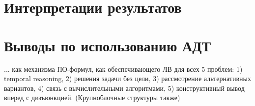 \section{Интерпретации результатов}

\section{Выводы по использованию АДТ}

... как механизма ПО-формул, как обеспечивающего ЛВ для всех 5 проблем: 1) temporal reasoning, 2) решения задачи без цели, 3) рассмотрение альтернативных вариантов, 4) связь с вычислительными алгоритмами, 5) конструктивный вывод вперед с дизъюнкцией. (Крупноблочные структуры также)
